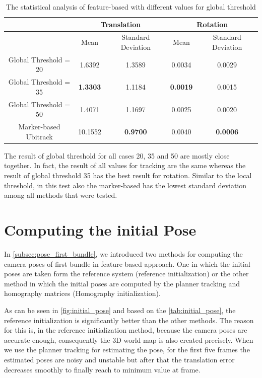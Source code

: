 \begin{table}[H]
\centering
  \begin{tabular}{| c || c | c | c | c |}
      \hline
       & \multicolumn{2}{c|}{Translation} & \multicolumn{2}{c|}{Rotation} \\ \hline
       & Mean & Standard Deviation & Mean & Standard Deviation \\ \hline
      Global Threshold = 20 & 1.6392 & 1.3589 & 0.0034 & 0.0029 \\ \hline
      Global Threshold = 35 & \textbf{1.3303} & 1.1184 & \textbf{0.0019} & 0.0015 \\ \hline
      Global Threshold = 50 & 1.4071 & 1.1697 & 0.0025 & 0.0020 \\ \hline
      Marker-based Ubitrack & 10.1552 & \textbf{0.9700} & 0.0040 & \textbf{0.0006} \\ \hline
  \end{tabular}
  \caption{The statistical analysis of feature-based with different values for global threshold} \label{tab:test_global_threshold}
\end{table}
The result of global threshold for all cases 20, 35 and 50 are mostly close together. In fact, the result of all values for tracking are the same whereas the result of global threshold 35 has the best result for rotation. Similar to the local threshold, in this test also the marker-based has the lowest standard deviation among all methods that were tested.

\section{Computing the initial Pose} \label{sec:initial_pose}
In \autoref{subsec:pose_first_bundle}, we introduced two methods for computing the camera poses of first bundle in feature-based approach. One in which the initial poses are taken form the reference system (reference initialization) or the other method in which the initial poses are computed by the planner tracking and homography matrices (Homography initialization).

As can be seen in \autoref{fig:initial_pose} and based on the \autoref{tab:initial_pose}, the reference initialization is significantly better than the other methods. The reason for this is, in the reference initialization method, because the camera poses are accurate enough, consequently the 3D world map is also created precisely. When we use the planner tracking for estimating the pose, for the first five frames the estimated poses are noisy and unstable but after that the translation error decreases smoothly to finally reach to minimum value at  frame.

